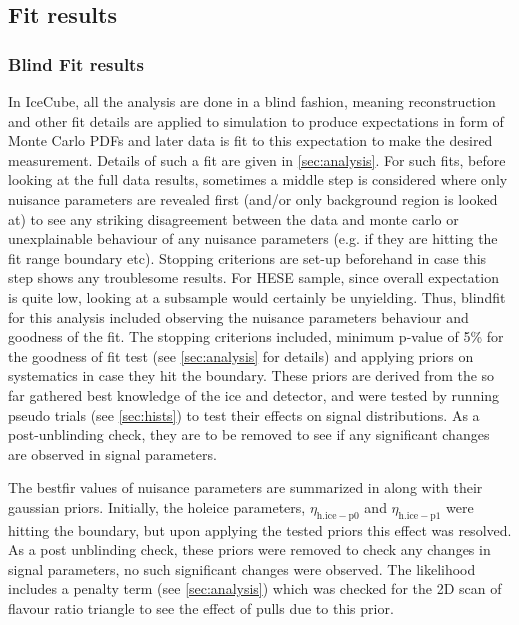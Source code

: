 \subsection{Fit results}
\label{sec:HESE12_fitresults}

\subsubsection{Blind Fit results}
\label{blindfit}
In IceCube, all the analysis are done in a blind fashion, meaning reconstruction and other fit details are applied to simulation to produce expectations in form of Monte Carlo PDFs and later data is fit to this expectation to make the desired measurement. Details of such a fit are given in \ref{sec:analysis}. For such fits, before looking at the full data results, sometimes a middle step is considered where only nuisance parameters are revealed first (and/or only background region is looked at) to see any striking disagreement between the data and monte carlo or unexplainable behaviour of any nuisance parameters (e.g. if they are hitting the fit range boundary etc).  Stopping criterions are set-up beforehand in case this step shows any troublesome results. For HESE sample, since overall expectation is quite low, looking at a subsample would certainly be unyielding. Thus, blindfit for this analysis included observing the nuisance parameters behaviour and goodness of the fit. The stopping criterions included, minimum p-value of 5\% for the goodness of fit test (see \ref{sec:analysis} for details) and applying priors on systematics in case they hit the boundary. These priors are derived from the so far gathered best knowledge of the ice and detector, and were tested by running pseudo trials (see \ref{sec:hists}) to test their effects on signal distributions. As a post-unblinding check, they are to be removed to see if any significant changes are observed in signal parameters. 

The bestfir values of nuisance parameters are summarized in  along with their gaussian priors. Initially, the holeice parameters, $\eta_{\mathrm{h.ice-p0}}$ and $\eta_{\mathrm{h.ice-p1}}$ were hitting the boundary, but upon applying the tested priors this effect was resolved. As a post unblinding check, these priors were removed to check any changes in signal parameters, no such significant changes were observed. The likelihood includes a penalty term (see \ref{sec:analysis}) which was checked for the 2D scan of flavour ratio triangle to see the effect of pulls due to this prior.     

